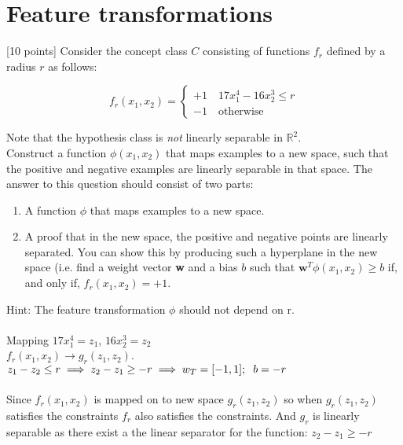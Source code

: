 \section{Feature transformations}\label{sec:q2}

[10 points] Consider the concept class $C$ consisting of functions $f_r$ defined by a radius $r$ as follows:

\begin{equation*}
            f_r(x_1,x_2) = \begin{cases}
                +1 \quad 17x_1^4-16x_2^3\leq r \\
                -1 \quad \text{otherwise}
            \end{cases}
            \label{eq-0}
        \end{equation*}

Note that the hypothesis class is \textit{not} linearly separable in $\mathbb{R}^2$.\\

Construct a function $\phi(x_1,x_2)$ that maps examples to a new space, such that the positive and negative examples are linearly separable in that space. The answer to this question should consist of two parts: 
\begin{enumerate}
\item A function $\phi$ that maps examples to a new space.
\item A proof that in the new space, the positive and negative points are linearly separated. You can show this by producing such a hyperplane in the new space (i.e. find a weight vector \textbf{w} and a bias $b$ such that $\textbf{w}^T\phi(x_1,x_2)\geq b$ if, and only if, $f_r(x_1,x_2)=+1$.
\end{enumerate}
Hint: The feature transformation $\phi$ should not depend on r.\\\\
Mapping $17x_1^4 = z_1$, $16x_2^3 = z_2$\\
$f_r(x_1,x_2) \rightarrow g_r(z_1,z_2)$.\\
$z_1-z_2 \le r \implies z_2 - z_1 \ge -r \implies w_T = [-1, 1];\hspace{2mm} b = -r$\\\\
Since $f_r(x_1, x_2)$ is mapped on to new space $g_r(z_1, z_2)$ so when $g_r(z_1, z_2)$ satisfies the constraints $f_r$ also satisfies the constraints. And $g_r$ is linearly separable as there exist a the linear separator for the function: $z_2 - z_1 \ge -r$ 
